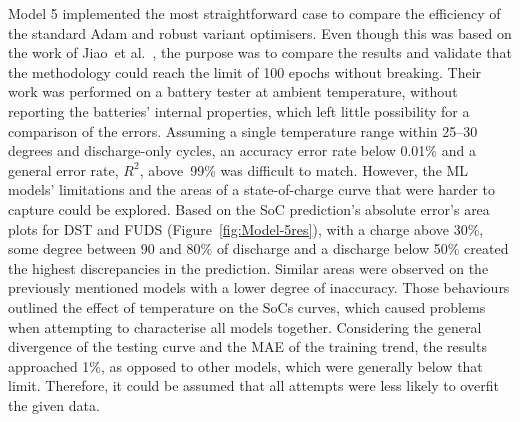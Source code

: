 %
%
Model 5 implemented the most straightforward case to compare the efficiency of the standard Adam and robust variant optimisers.
Even though this was based on the work of Jiao~et al.~\cite{jiao_gru-rnn_2020}, the purpose was to compare the results and validate that the methodology could reach the limit of 100 epochs without breaking.
Their work was performed on a battery tester at ambient temperature, without reporting the batteries' internal properties, which left little possibility for a comparison of the errors.
Assuming a single temperature range within 25--30 degrees and discharge-only cycles, an accuracy error rate below 0.01\% and a general error rate, $R^2$, above~99\% was difficult to match.
However, the ML models' limitations and the areas of a state-of-charge curve that were harder to capture could be explored.
Based on the SoC prediction's absolute error's area plots for DST and FUDS (Figure~\ref{fig:Model-5res}), with a charge above 30\%, some degree between 90 and 80\% of discharge and a discharge below 50\% created the highest discrepancies in the prediction.
Similar areas were observed on the previously mentioned models with a lower degree of inaccuracy.
Those behaviours outlined the effect of temperature on the SoCs curves, which caused problems when attempting to characterise all models together.
Considering the general divergence of the testing curve and the MAE of the training trend, the results approached 1\%, as opposed to other models, which were generally below that limit.
Therefore, it could be assumed that all attempts were less likely to overfit the given data.


